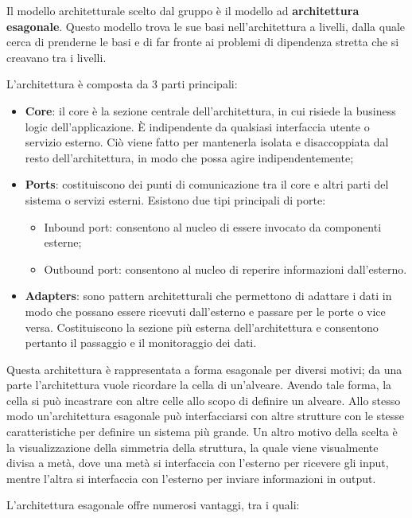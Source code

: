 \par Il modello architetturale scelto dal gruppo è il modello ad \textbf{architettura esagonale}. Questo modello trova le sue basi nell'architettura a livelli, dalla quale cerca di prenderne le basi e di far fronte ai problemi di dipendenza stretta che si creavano tra i livelli.
\par L'architettura è composta da 3 parti principali:
\begin{itemize}
    \item \textbf{Core}: il core è la sezione centrale dell'architettura, in cui risiede la business logic dell'applicazione. È indipendente da qualsiasi interfaccia utente o servizio esterno. Ciò viene fatto per mantenerla isolata e disaccoppiata dal resto dell'architettura, in modo che possa agire indipendentemente;
    \item \textbf{Ports}: costituiscono dei punti di comunicazione tra il core e altri parti del sistema o servizi esterni. Esistono due tipi principali di porte:
    \begin{itemize}
        \item Inbound port: consentono al nucleo di essere invocato da componenti esterne;
        \item Outbound port: consentono al nucleo di reperire informazioni dall'esterno.
    \end{itemize}
    \item \textbf{Adapters}: sono pattern architetturali che permettono di adattare i dati in modo che possano essere ricevuti dall'esterno e passare per le porte o vice versa. Costituiscono la sezione più esterna dell'architettura e consentono pertanto il passaggio e il monitoraggio dei dati.
\end{itemize}
\vspace{0.5\baselineskip}
\par Questa architettura è rappresentata a forma esagonale per diversi motivi; da una parte l'architettura vuole ricordare la cella di un'alveare. Avendo tale forma, la cella si può incastrare con altre celle allo scopo di definire un alveare. Allo stesso modo un'architettura esagonale può interfacciarsi con altre strutture con le stesse caratteristiche per definire un sistema più grande. Un altro motivo della scelta è la visualizzazione della simmetria della struttura, la quale viene visualmente divisa a metà, dove una metà si interfaccia con l'esterno per ricevere gli input, mentre l'altra si interfaccia con l'esterno per inviare informazioni in output.
\par L'architettura esagonale offre numerosi vantaggi, tra i quali:

